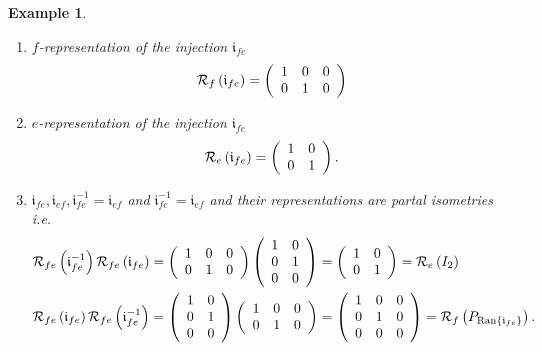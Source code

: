 \documentclass[aps,preprint]{revtex4}%
\newtheorem{example}[theorem]{Example}
\begin{document}
\begin{example}
\begin{enumerate}
\begin{enumerate}
\item $f$-representation of the injection $\mathfrak{i}_{fe}$%
\begin{equation}
\mathcal{R}_{f}\left(  \mathfrak{i}_{fe}\right)  =\left(
\begin{array}
[c]{ccc}%
1 & 0 & 0\\
0 & 1 & 0
\end{array}
\right)
\end{equation}


\item $e$-representation of the injection $\mathfrak{i}_{fe}$%
\begin{equation}
\mathcal{R}_{e}\left(  \mathfrak{i}_{fe}\right)  =\left(
\begin{array}
[c]{cc}%
1 & 0\\
0 & 1
\end{array}
\right)  .
\end{equation}


\item $\mathfrak{i}_{fe},\mathfrak{i}_{ef},\mathfrak{i}_{fe}^{-1}%
=\mathfrak{i}_{ef}$ and $\mathfrak{i}_{fe}^{-1}=\mathfrak{i}_{ef}$ and their
representations are partal isometries i.e.
\begin{align}
\mathcal{R}_{fe}\left(  \mathfrak{i}_{fe}^{-1}\right)  \mathcal{R}_{fe}\left(
\mathfrak{i}_{fe}\right)   &  =\left(
\begin{array}
[c]{ccc}%
1 & 0 & 0\\
0 & 1 & 0
\end{array}
\right)  \left(
\begin{array}
[c]{cc}%
1 & 0\\
0 & 1\\
0 & 0
\end{array}
\right)  =\left(
\begin{array}
[c]{cc}%
1 & 0\\
0 & 1
\end{array}
\right)  =\mathcal{R}_{e}\left(  I_{2}\right) \\
\mathcal{R}_{fe}\left(  \mathfrak{i}_{fe}\right)  \mathcal{R}_{fe}\left(
\mathfrak{i}_{fe}^{-1}\right)   &  =\left(
\begin{array}
[c]{cc}%
1 & 0\\
0 & 1\\
0 & 0
\end{array}
\right)  \left(
\begin{array}
[c]{ccc}%
1 & 0 & 0\\
0 & 1 & 0
\end{array}
\right)  =\left(
\begin{array}
[c]{ccc}%
1 & 0 & 0\\
0 & 1 & 0\\
0 & 0 & 0
\end{array}
\right)  =\mathcal{R}_{f}\left(  P_{\operatorname{Ran}\left\{  \mathfrak{i}%
_{fe}\right\}  }\right)  .
\end{align}



\end{enumerate}
\end{enumerate}
\end{example}
\end{document}

